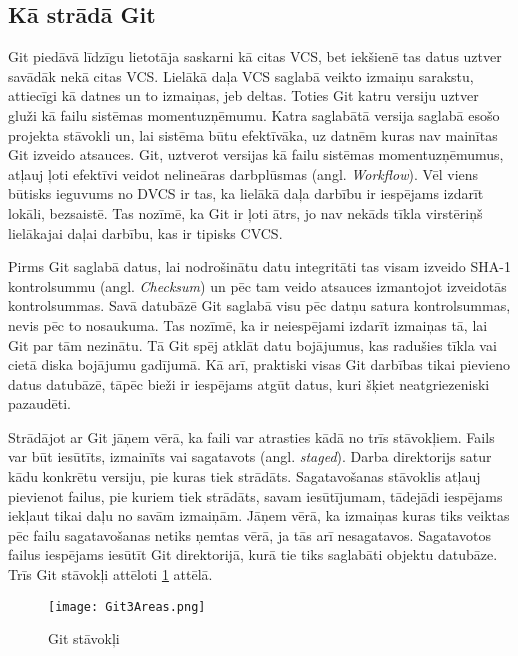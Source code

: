 \subsection{Kā strādā Git}
Git piedāvā līdzīgu lietotāja saskarni kā citas VCS, bet iekšienē tas datus uztver savādāk nekā citas VCS. Lielākā daļa VCS saglabā veikto izmaiņu sarakstu, attiecīgi kā datnes un to izmaiņas, jeb deltas.
Toties Git katru versiju uztver gluži kā failu sistēmas momentuzņēmumu. Katra saglabātā versija saglabā esošo projekta stāvokli un, lai sistēma būtu efektīvāka, uz datnēm kuras nav mainītas Git izveido atsauces. Git, uztverot versijas kā failu sistēmas momentuzņēmumus, atļauj ļoti efektīvi veidot nelineāras darbplūsmas (angl. \textit{Workflow}).
Vēl viens būtisks ieguvums no DVCS ir tas, ka lielākā daļa darbību ir iespējams izdarīt lokāli, bezsaistē. Tas nozīmē, ka Git ir ļoti ātrs, jo nav nekāds tīkla virstēriņš lielākajai daļai darbību, kas ir tipisks CVCS.

Pirms Git saglabā datus, lai nodrošinātu datu integritāti tas visam izveido SHA-1 kontrolsummu (angl. \textit{Checksum}) un pēc tam veido atsauces izmantojot izveidotās kontrolsummas. Savā datubāzē Git saglabā visu pēc datņu satura kontrolsummas, nevis pēc to nosaukuma. Tas nozīmē, ka ir neiespējami izdarīt izmaiņas tā, lai Git par tām nezinātu. Tā Git spēj atklāt datu bojājumus, kas radušies tīkla vai cietā diska bojājumu gadījumā. Kā arī, praktiski visas Git darbības tikai pievieno datus datubāzē, tāpēc bieži ir iespējams atgūt datus, kuri šķiet neatgriezeniski pazaudēti.

Strādājot ar Git jāņem vērā, ka faili var atrasties kādā no trīs stāvokļiem. Fails var būt iesūtīts, izmainīts vai sagatavots (angl. \textit{staged}). Darba direktorijs satur kādu konkrētu versiju, pie kuras tiek strādāts. Sagatavošanas stāvoklis atļauj pievienot failus, pie kuriem tiek strādāts, savam iesūtījumam, tādejādi iespējams iekļaut tikai daļu no savām izmaiņām. Jāņem vērā, ka izmaiņas kuras tiks veiktas pēc failu sagatavošanas netiks ņemtas vērā, ja tās arī nesagatavos. Sagatavotos failus iespējams iesūtīt Git direktorijā, kurā tie tiks saglabāti objektu datubāze.
Trīs Git stāvokļi attēloti \ref{fig:Git3Areas} attēlā. \cite[Git Basics]{chacon2014progit}
\begin{figure}[H]%
	\centering
	\captionsetup{justification=centering}
	\texttt{[image: Git3Areas.png]}
	\caption{Git stāvokļi}
	\label{fig:Git3Areas}
\end{figure}


